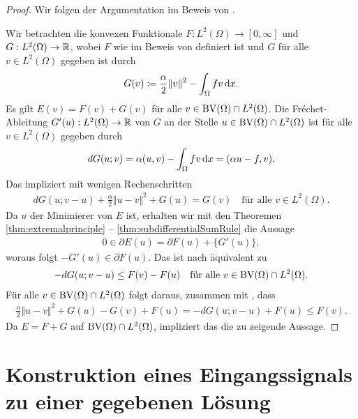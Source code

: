 \begin{proof}
  Wir folgen der Argumentation im Beweis von \cite[S. 309, Lemma 10.2]{Bar15}.

  Wir betrachten die konvexen Funktionale
  $F:L^2(\Omega)\to [0,\infty]$ und $G:L^2(\Omega)\to \mathbb{R}$, wobei 
  $F$ wie im Beweis von  definiert ist und $G$
  für alle $v\in L^2(\Omega)$ gegeben ist durch 
  \begin{align*}
    G(v)\coloneqq \frac{\alpha}{2}\Vert v\Vert^2 - \int_\Omega f v\,\mathrm{d}x.
  \end{align*}
  Es gilt $E(v) = F(v)+G(v)$ für alle $v\in \textup{BV}(\Omega)\cap L^2(\Omega)$.
  Die Fr\'echet-Ableitung $G'(u): L^2(\Omega)\to\mathbb{R}$ von $G$ an der Stelle
  $u\in \textup{BV}(\Omega)\cap L^2(\Omega)$ ist für alle $v\in L^2(\Omega)$ gegeben
  durch
  \begin{align*}
    dG(u;v) = \alpha (u,v) - \int_\Omega f v\,\mathrm{d}x 
    = (\alpha u-f ,v).
  \end{align*}
  Das impliziert mit wenigen Rechenschritten
  \begin{align}\label{eq:strongConvexityG}
    dG(u;v-u) +\frac{\alpha}{2}\Vert u-v\Vert^2+G(u) 
    =
    G(v)
    \quad\text{für alle } v\in L^2(\Omega).
  \end{align}
  Da $u$ der Minimierer von $E$ ist, erhalten wir mit den Theoremen
  \ref{thm:extremalprinciple} -- \ref{thm:subdifferentialSumRule} die Aussage
  \begin{align*}
    0\in\partial E(u) = \partial F(u)+\{G'(u)\},
  \end{align*}
  woraus folgt 
  $ -G'(u)\in\partial F(u).$
  Das ist nach  äquivalent zu
  \begin{align*}
    -dG(u;v-u)\leq F(v)-F(u)\quad\text{für alle }v\in\textup{BV}(\Omega)\cap
    L^2(\Omega).
  \end{align*}
  Für alle $v\in \textup{BV}(\Omega)\cap L^2(\Omega)$ folgt daraus, zusammen mit
  , dass
  \begin{align*}
    \frac{\alpha}{2}\Vert u-v\Vert^2+G(u)-G(v)+F(u)
    = -dG(u;v-u)+F(u)\leq F(v).
  \end{align*}
  Da $E=F+G$ auf $\textup{BV}(\Omega)\cap L^2(\Omega)$, impliziert das die zu zeigende
  Aussage.
\end{proof}


\section{Konstruktion eines Eingangssignals zu einer gegebenen Lösung}
\label{sec:constructionInputSignal}


